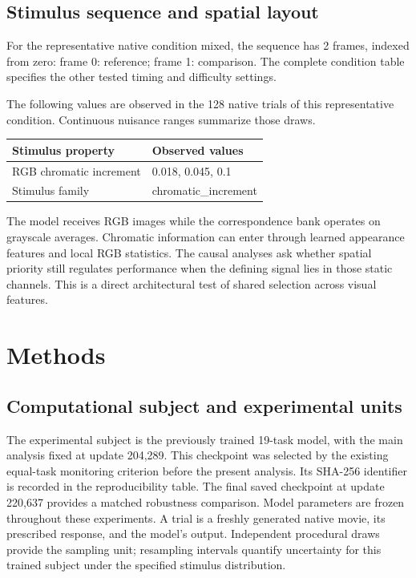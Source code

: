 \documentclass[11pt]{article}
\begin{document}
\subsection{Stimulus sequence and spatial layout}
For the representative native condition mixed, the sequence has 2 frames, indexed from zero: frame 0: reference; frame 1: comparison. The complete condition table specifies the other tested timing and difficulty settings.

The following values are observed in the 128 native trials of this representative condition. Continuous nuisance ranges summarize those draws.
\begin{center}\small\begin{tabular}{p{}p{}}\toprule Stimulus property & Observed values\\\midrule
RGB chromatic increment & 0.018, 0.045, 0.1\\
Stimulus family & chromatic\_\allowbreak{}increment\\
\bottomrule\end{tabular}\normalsize\end{center}
The model receives RGB images while the correspondence bank operates on grayscale averages. Chromatic information can enter through learned appearance features and local RGB statistics. The causal analyses ask whether spatial priority still regulates performance when the defining signal lies in those static channels. This is a direct architectural test of shared selection across visual features.


\section{Methods}
\subsection{Computational subject and experimental units}
The experimental subject is the previously trained 19-task model, with the main analysis fixed at update 204,289. This checkpoint was selected by the existing equal-task monitoring criterion before the present analysis. Its SHA-256 identifier is recorded in the reproducibility table. The final saved checkpoint at update 220,637 provides a matched robustness comparison. Model parameters are frozen throughout these experiments. A trial is a freshly generated native movie, its prescribed response, and the model's output. Independent procedural draws provide the sampling unit; resampling intervals quantify uncertainty for this trained subject under the specified stimulus distribution.
\end{document}

